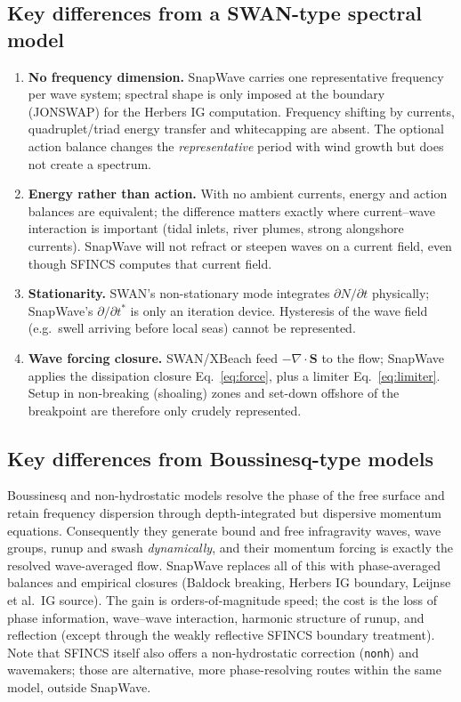 \documentclass[11pt,a4paper]{article}
\newcommand{\code}[1]{\texttt{#1}}
\begin{document}
\subsection{Key differences from a SWAN-type spectral model}

\begin{enumerate}
  \item \textbf{No frequency dimension.} SnapWave carries one representative
  frequency per wave system; spectral shape is only imposed at the boundary
  (JONSWAP) for the Herbers IG computation. Frequency shifting by currents,
  quadruplet/triad energy transfer and whitecapping are absent. The optional
  action balance changes the \emph{representative} period with wind growth but
  does not create a spectrum.
  \item \textbf{Energy rather than action.} With no ambient currents, energy and
  action balances are equivalent; the difference matters exactly where
  current--wave interaction is important (tidal inlets, river plumes, strong
  alongshore currents). SnapWave will not refract or steepen waves on a current
  field, even though SFINCS computes that current field.
  \item \textbf{Stationarity.} SWAN's non-stationary mode integrates
  $\partial N/\partial t$ physically; SnapWave's $\partial/\partial t^{*}$ is
  only an iteration device. Hysteresis of the wave field (e.g.\ swell arriving
  before local seas) cannot be represented.
  \item \textbf{Wave forcing closure.} SWAN/XBeach feed
  $-\nabla\!\cdot\!\mathbf{S}$ to the flow; SnapWave applies the dissipation
  closure Eq.~\eqref{eq:force}, plus a limiter Eq.~\eqref{eq:limiter}. Setup in
  non-breaking (shoaling) zones and set-down offshore of the breakpoint are
  therefore only crudely represented.
\end{enumerate}

\subsection{Key differences from Boussinesq-type models}

Boussinesq and non-hydrostatic models resolve the phase of the free surface and
retain frequency dispersion through depth-integrated but dispersive momentum
equations. Consequently they generate bound and free infragravity waves, wave
groups, runup and swash \emph{dynamically}, and their momentum forcing is
exactly the resolved wave-averaged flow. SnapWave replaces all of this with
phase-averaged balances and empirical closures (Baldock breaking, Herbers IG
boundary, Leijnse et al.\ IG source). The gain is orders-of-magnitude speed;
the cost is the loss of phase information, wave--wave interaction, harmonic
structure of runup, and reflection (except through the weakly reflective SFINCS
boundary treatment). Note that SFINCS itself also offers a non-hydrostatic
correction (\code{nonh}) and wavemakers; those are alternative, more
phase-resolving routes within the same model, outside SnapWave.
\end{document}
